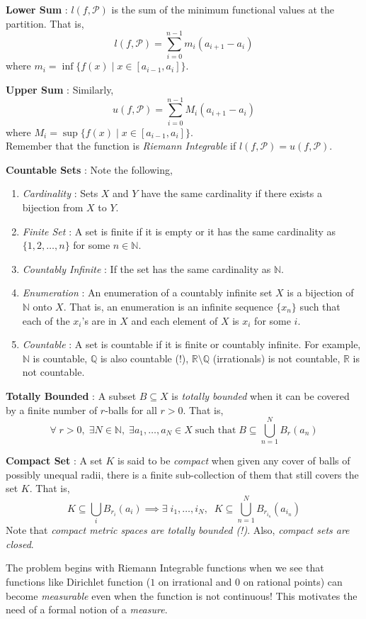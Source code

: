 \documentclass{article}
\theoremstyle{definition}
\theoremstyle{remark}
\theoremstyle{definition}
\theoremstyle{definition}
\theoremstyle{definition}
\newcommand{\bunion}{\bigcup}
\newcommand{\lsum}[2]{l(#1,\mathcal{#2})}
\newcommand{\usum}[2]{u(#1,\mathcal{#2})}
\newcommand{\where}{\;\vert\;}
\newcommand{\R}{\mathbb{R}}
\newcommand{\N}{\mathbb{N}}
\newcommand{\Q}{\mathbb{Q}}
\begin{document}
\begin{itemize}
	\item {\textbf{Lower Sum} : $ l(f,\mathcal{P}) $ is the sum of the minimum functional values at the partition. That is,
		\[\lsum{f}{P} = \sum_{i=0}^{n-1} m_i (a_{i+1} - a_i)\]
		where $ m_i = \inf\{f(x)\;\vert\;x\in [a_{i-1},a_i]\}$.}
	\item {\textbf{Upper Sum} : Similarly,
		\[\usum{f}{P} = \sum_{i=0}^{n-1} M_i (a_{i+1} - a_i)\]
		where $ M_i = \sup\{f(x)\where x\in [a_{i-1},a_i] \} $.\\
		Remember that the function is \emph{Riemann Integrable} if $ l(f,\mathcal{P}) = u(f,\mathcal{P}) $.}
	\item{\textbf{Countable Sets} : Note the following,
\begin{enumerate}
	\item{\emph{Cardinality} : Sets $ X $ and $ Y $ have the same cardinality if there exists a bijection from $ X $ to $ Y $.}
	\item{\emph{Finite Set} : A set is finite if it is empty or it has the same cardinality as $ \{1,2,\dots,n\} $ for some $ n\in \N $.}
	\item{\emph{Countably Infinite} : If the set has the same cardinality as $ \N $.}
	\item {\emph{Enumeration} : An enumeration of a countably infinite set $ X $ is a bijection of $ \N $ onto $ X $. That is, an enumeration is an infinite sequence $ \{x_n\} $ such that each of the $ x_i $'s are in $ X $ and each element of $ X $ is $ x_i $ for some $ i $.}
	\item {\emph{Countable} : A set is countable if it is finite or countably infinite. For example, $ \N $ is countable, $ \Q $ is also countable (!), $ \R \setminus \Q $ (irrationals) is not countable, $ \R $ is not countable.}
\end{enumerate}	
\item {\textbf{Totally Bounded} : A subset $ B\subseteq X $ is \emph{totally bounded} when it can be covered by a finite number of $ r $-balls for all $ r>0 $. That is,
\[\forall \; r > 0,\;\exists N\in \N,\;\exists a_1,\dots,a_N\in X\;\text{such that}\;B\subseteq \bunion_{n=1}^N B_{r}(a_n)\]
}
\item{\textbf{Compact Set} : A set $ K $ is said to be \emph{compact} when given any cover of balls of possibly unequal radii, there is a finite sub-collection of them that still covers the set $ K $. That is,
\[K\subseteq \bunion_{i}B_{r_i}(a_i)\implies \exists \;i_1,\dots,i_N,\;\;K \subseteq \bunion_{n=1}^N B_{r_{i_n}}(a_{i_n})\]
Note that \emph{compact metric spaces are totally bounded (!)}. Also, \emph{compact sets are closed}.
}
} 
\end{itemize}
The problem begins with Riemann Integrable functions when we see that functions like Dirichlet function ($ 1 $ on  irrational and $ 0 $ on rational points) can become \emph{measurable} even when the function is not continuous! This motivates the need of a formal notion of a \emph{measure}.
\end{document}
